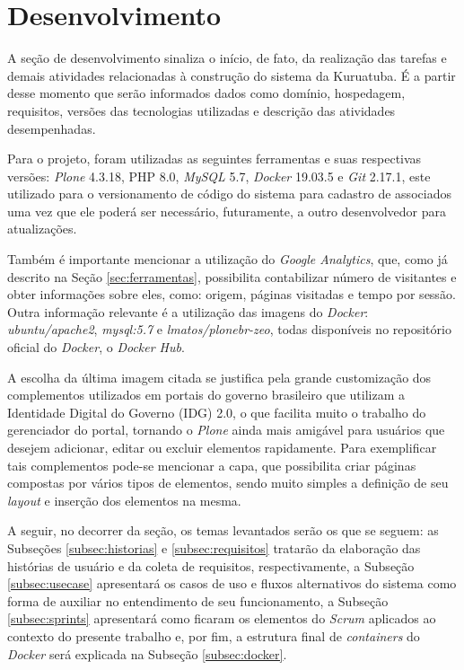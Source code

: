 \hspace{2.5cm}
\section{Desenvolvimento}
\label{sec:desenvolvimento}

\hspace{2.5cm}

A seção de desenvolvimento sinaliza o início, de fato, da realização das tarefas e demais atividades relacionadas à construção do sistema da Kuruatuba. É a partir desse momento que serão informados dados como domínio, hospedagem, requisitos, versões das tecnologias utilizadas e descrição das atividades desempenhadas.

Para o projeto, foram utilizadas as seguintes ferramentas e suas respectivas versões: \textit{Plone} 4.3.18, PHP 8.0, \textit{MySQL} 5.7, \textit{Docker} 19.03.5 e \textit{Git} 2.17.1, este utilizado para o versionamento de código do sistema para cadastro de associados uma vez que ele poderá ser necessário, futuramente, a outro desenvolvedor para atualizações. 

Também é importante mencionar a utilização do \textit{Google Analytics}, que, como já descrito na Seção \ref{sec:ferramentas}, possibilita contabilizar número de visitantes e obter informações sobre eles, como: origem, páginas visitadas e tempo por sessão. Outra informação relevante é a utilização das imagens do \textit{Docker}: \textit{ubuntu/apache2}, \textit{mysql:5.7} e \textit{lmatos/plonebr-zeo}, todas disponíveis no repositório oficial do \textit{Docker}, o \textit{Docker Hub}. 

A escolha da última imagem citada se justifica pela grande customização dos complementos utilizados em portais do governo brasileiro que utilizam a Identidade Digital do Governo (IDG) 2.0, o que facilita muito o trabalho do gerenciador do portal, tornando o \textit{Plone} ainda mais amigável para usuários que desejem adicionar, editar ou excluir elementos rapidamente. Para exemplificar tais complementos pode-se mencionar a capa, que possibilita criar páginas compostas por vários tipos de elementos, sendo muito simples a definição de seu \textit{layout} e inserção dos elementos na mesma.  

A seguir, no decorrer da seção, os temas levantados serão os que se seguem: as Subseções \ref{subsec:historias} e \ref{subsec:requisitos} tratarão da elaboração das histórias de usuário e da coleta de requisitos, respectivamente, a Subseção \ref{subsec:usecase} apresentará os casos de uso e fluxos alternativos do sistema como forma de auxiliar no entendimento de seu funcionamento, a Subseção \ref{subsec:sprints} apresentará como ficaram os elementos do \textit{Scrum} aplicados ao contexto do presente trabalho e, por fim, a estrutura final de \textit{containers} do \textit{Docker} será explicada na Subseção \ref{subsec:docker}.

